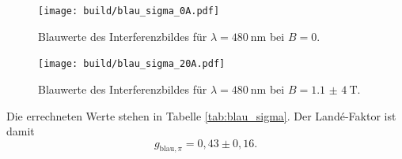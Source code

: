 \begin{figure}[htb]
  \centering
  \texttt{[image: build/blau\_sigma\_0A.pdf]}
  \caption{Blauwerte des Interferenzbildes für $\lambda=\SI{480}{\nano\meter}$ bei $B=0$.}
  \label{fig:blau_sigma_0A_plot}
\end{figure}
\begin{figure}[htb]
  \centering
  \texttt{[image: build/blau\_sigma\_20A.pdf]}
  \caption{Blauwerte des Interferenzbildes für $\lambda=\SI{480}{\nano\meter}$ bei $B=\SI{1,1(4)}{\tesla}$.}
  \label{fig:blau_sigma_20A_plot}
\end{figure}
Die errechneten Werte stehen in Tabelle \ref{tab:blau_sigma}.
Der Landé-Faktor ist damit
\begin{equation}
\label{eqn:g_blau_pi}
g_{\text{blau},\pi}=0,43\pm0,16.
\end{equation}

